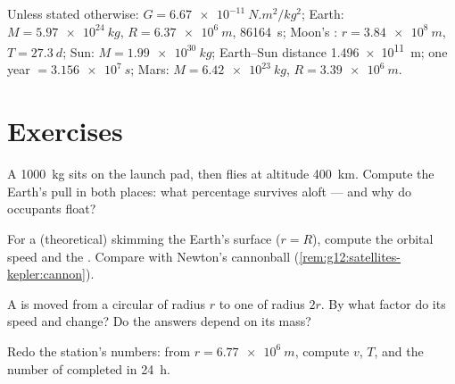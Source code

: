 \begin{remark}\label{rem:g12:satellites-kepler:data}
Unless stated otherwise: $G = \qty{6.67e-11}{N.m^2/kg^2}$; Earth:
$M = \qty{5.97e24}{kg}$, $R = \qty{6.37e6}{m}$, 
\qty{86164}{s}; Moon's : $r = \qty{3.84e8}{m}$, $T =
\qty{27.3}{d}$; Sun: $M = \qty{1.99e30}{kg}$; Earth--Sun distance
\qty{1.496e11}{m}; one year $= \qty{3.156e7}{s}$; Mars: $M =
\qty{6.42e23}{kg}$, $R = \qty{3.39e6}{m}$.
\end{remark}

\section{Exercises}

\begin{exercise}[$\star$]\label{exo:g12:satellites-kepler:1}
A \qty{1000}{kg}  sits on the launch pad, then flies at
altitude \qty{400}{km}. Compute the Earth's pull in both places:
what percentage survives aloft --- and why do occupants float?
\end{exercise}

\begin{exercise}[$\star$]\label{exo:g12:satellites-kepler:2}
For a (theoretical)  skimming the Earth's surface
($r = R$), compute the orbital speed and the . Compare with
Newton's cannonball (\cref{rem:g12:satellites-kepler:cannon}).
\end{exercise}

\begin{exercise}[$\star$]\label{exo:g12:satellites-kepler:3}
A  is moved from a circular  of radius $r$ to one of
radius $2r$. By what factor do its speed and  change? Do the
answers depend on its mass?
\end{exercise}

\begin{exercise}[$\star$]\label{exo:g12:satellites-kepler:4}
Redo the station's numbers: from $r = \qty{6.77e6}{m}$, compute
$v$, $T$, and the number of  completed in \qty{24}{h}.
\end{exercise}

